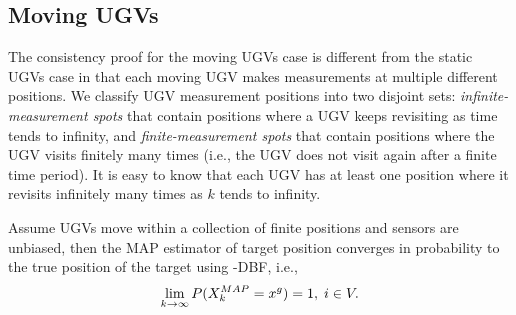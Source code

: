 	\subsection{Moving UGVs}
	The consistency proof for the moving UGVs case is different from the static UGVs case in that each moving UGV makes measurements at multiple different positions.
	We classify UGV measurement positions into two disjoint sets: \textit{infinite-measurement spots} that contain positions where a UGV keeps revisiting as time tends to infinity, and \textit{finite-measurement spots} that contain positions where the UGV visits finitely many times (i.e., the UGV does not visit again after a finite time period).
	It is easy to know that each UGV has at least one position where it revisits infinitely many times as $k$ tends to infinity.
%		
			
	\begin{thm}\label{thm:\proto-dbf-mov-ugv}
		Assume UGVs move within a collection of finite positions and sensors are unbiased, then the MAP estimator of target position converges in probability to the true position of the target using \proto-DBF, i.e.,
		\small\begin{equation*}
		\lim\limits_{k\rightarrow \infty}
		P(X^{MAP}_k=x^g)=1,\;i\in V.
		\end{equation*}\normalsize
	\end{thm}
		
